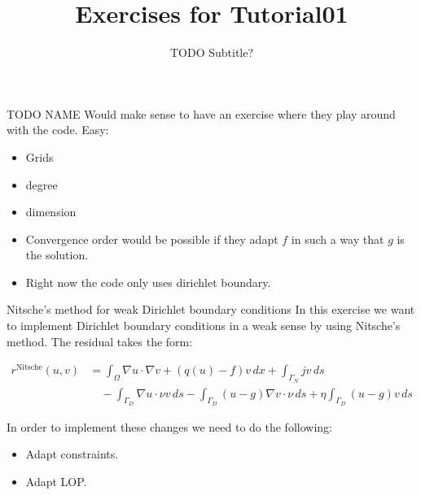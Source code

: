 \documentclass[12pt,a4paper]{article}
\title{\textbf{Exercises for Tutorial01}}
\subtitle{TODO Subtitle?}
\begin{document}
\exerciseheader

\begin{Exercise}{TODO NAME}
  Would make sense to have an exercise where they play around with the
  code. Easy:
  \begin{itemize}
    \item Grids
    \item degree
    \item dimension
    \item Convergence order would be possible if they adapt $f$ in such a way
      that $g$ is the solution.
    \item Right now the code only uses dirichlet boundary.
    \end{itemize}
\end{Exercise}

\begin{Exercise}{Nitsche's method for weak Dirichlet boundary
    conditions}
  In this exercise we want to implement Dirichlet boundary conditions
  in a weak sense by using Nitsche's method.  The residual takes the
  form:

  \begin{align*}
    r^{\text{Nitsche}}(u,v) &= \int_\Omega \nabla u \cdot \nabla v + (q(u)-f)v\,dx + \int_{\Gamma_N} jv\,ds \\
    &\quad - \int_{\Gamma_D} \nabla u \cdot\nu v\,ds - \int_{\Gamma_D} (u-g)\nabla v \cdot\nu\,ds
    + \eta \int_{\Gamma_D} (u-g)v\,ds
  \end{align*}

  In order to implement these changes we need to do the following:
  \begin{itemize}
  \item Adapt constraints.
  \item Adapt LOP.
  \end{itemize}


\end{Exercise}
\end{document}
